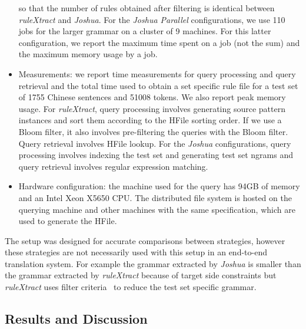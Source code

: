 \begin{itemize}
    so that the number of rules obtained after filtering is identical between
    \emph{ruleXtract} and \emph{Joshua}. For the \emph{Joshua Parallel}
    configurations, we use 110 jobs for the larger grammar on a cluster of 9
    machines. For this latter configuration, we report the maximum time spent on
    a job (not the sum) and the maximum memory usage by a job.
  \item Measurements: we report time measurements for query processing and query
    retrieval and the total time used to obtain a set specific rule file for a
    test set of 1755 Chinese sentences and 51008 tokens. We also report peak
    memory usage. For \emph{ruleXtract}, query processing involves generating
    source pattern instances and sort them according to the HFile sorting order.
    If we use a Bloom filter, it also involves pre-filtering the queries with
    the Bloom filter. Query retrieval involves HFile lookup. For the
    \emph{Joshua} configurations, query processing involves indexing the test
    set and generating test set ngrams and query retrieval involves regular
    expression matching.
  \item Hardware configuration: the machine used for the query has 94GB of
    memory and an Intel Xeon X5650 CPU. The distributed file system is hosted on
    the querying machine and other machines with the same specification, which
    are used to generate the HFile.
\end{itemize}
%
The setup was designed for accurate comparisons between strategies, however
these strategies are not necessarily used with this setup in an end-to-end
translation system. For example the grammar extracted by \emph{Joshua} is
smaller than the grammar extracted by \emph{ruleXtract} because of target side
constraints but \emph{ruleXtract} uses filter
criteria~\citep{iglesias-degispert-banga-byrne:2009:EACL} to reduce the test set
specific grammar.

\subsection{Results and Discussion}

